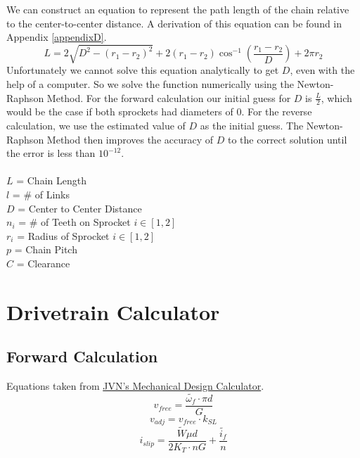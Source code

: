 \documentclass[11pt,a4paper,titlepage]{article}
\begin{document}
	We can construct an equation to represent the path length of the chain relative to the center-to-center distance. A derivation of this equation can be found in Appendix \ref{appendixD}.
	\begin{equation} \label{chain_len}
	L = 2 \sqrt{D^2 - (r_1 - r_2)^2} + 2 (r_1 - r_2) \cos^{-1} \left( \frac{r_1 - r_2}{D} \right) + 2 \pi r_2
	\end{equation}
	Unfortunately we cannot solve this equation analytically to get $D$, even with the help of a computer. So we solve the function numerically using the Newton-Raphson Method. For the forward calculation our initial guess for $D$ is $\frac{L}{2}$, which would be the case if both sprockets had diameters of 0. For the reverse calculation, we use the estimated value of $D$ as the initial guess. The Newton-Raphson Method then improves the accuracy of $D$ to the correct solution until the error is less than $10^{-12}$.\\ \\
	$L$ = Chain Length \\
	$l$ = \# of Links \\
	$D$ = Center to Center Distance \\
	$n_i$ = \# of Teeth on Sprocket $i \in [1,2]$ \\
	$r_i$ = Radius of Sprocket $i \in [1,2]$ \\
	$p$ = Chain Pitch \\
	$C$ = Clearance
	
	\newpage
	\section{Drivetrain Calculator}
	\subsection{Forward Calculation}
	Equations taken from \href{https://www.chiefdelphi.com/uploads/default/original/3X/2/b/2bf9206b962f74ed5556a0ae936ef0bf365ac975.xlsx}{JVN's Mechanical Design Calculator}.
	\begin{equation} \label{v_free}
	v_{free} = \frac{\tilde{\omega_f} \cdot \pi d}{G}
	\end{equation}
	\begin{equation} \label{v_adj}
	v_{adj} = v_{free} \cdot k_{SL}
	\end{equation}
	\begin{equation}
	i_{slip} = \frac{\tilde{W} \mu d}{2 K_T \cdot n G} + \frac{\tilde{i_f}}{n}
	\end{equation}
	
\end{document}
